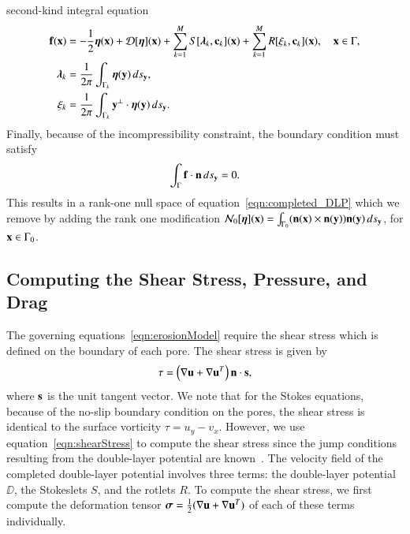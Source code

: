\documentclass[preprint, 10pt]{elsarticle}
\begin{document}
second-kind integral equation
\begin{align}
  \ff(\xx) &= -\frac{1}{2}\eeta(\xx) + \DD[\eeta](\xx) + 
      \sum_{k=1}^{M} S[\llambda_k,\cc_k](\xx) +
      \sum_{k=1}^{M} R[\xi_k,\cc_k](\xx), \quad \xx \in \Gamma, \\
  \llambda_k &= \frac{1}{2\pi}\int_{\Gamma_k} \eeta(\yy) \, ds_\yy, \\
  \xi_k &= \frac{1}{2\pi}\int_{\Gamma_k} \yy^\perp \cdot \eeta(\yy)
  \, ds_\yy.
  \label{eqn:completed_DLP}
\end{align}
Finally, because of the incompressibility constraint, the boundary
condition must satisfy 
\begin{align}
  \int_{\Gamma} \ff \cdot \nn \, ds_\yy = 0.
\end{align}
This results in a rank-one null space of
equation~\eqref{eqn:completed_DLP} which we remove by adding the rank
one modification $\NN_0[\eeta](\xx) = \int_{\Gamma_0} (\nn(\xx) \times
\nn(\yy))\nn(\yy) \, ds_\yy$, for $\xx \in \Gamma_0$.




\subsection{Computing the Shear Stress, Pressure, and Drag} 
The governing equations~\eqref{eqn:erosionModel} require the shear
stress which is defined on the boundary of each pore.  The shear stress
is given by
\begin{align}
  \tau = \left(\nabla \uu + \nabla \uu^T \right)\nn \cdot \ss,
  \label{eqn:shearStress}
\end{align}
where $\ss$ is the unit tangent vector.  We note that for the Stokes
equations, because of the no-slip boundary condition on the pores, the
shear stress is identical to the surface vorticity $\tau = u_y - v_x$.
However, we use equation~\eqref{eqn:shearStress} to compute the shear
stress since the jump conditions resulting from the double-layer
potential are known~\cite{qua-bir2014a}.  The velocity field of the
completed double-layer potential involves three terms: the double-layer
potential $\DD$, the Stokeslets $S$, and the rotlets $R$.  To compute
the shear stress, we first compute the deformation tensor $\ssigma =
\frac{1}{2}(\nabla\uu + \nabla\uu^T)$ of each of these terms
individually.
\end{document}
